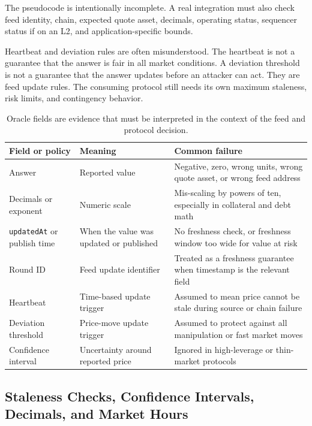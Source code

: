 The pseudocode is intentionally incomplete. A real integration must also check feed identity, chain, expected quote asset, decimals, operating status, sequencer status if on an L2, and application-specific bounds.

Heartbeat and deviation rules are often misunderstood. The heartbeat is not a guarantee that the answer is fair in all market conditions. A deviation threshold is not a guarantee that the answer updates before an attacker can act. They are feed update rules. The consuming protocol still needs its own maximum staleness, risk limits, and contingency behavior.

\begin{table}[htbp]
\centering
\small
\renewcommand{\arraystretch}{1.16}
\begin{tabularx}{\textwidth}{@{}>{\RaggedRight\arraybackslash}p{}>{\RaggedRight\arraybackslash}p{}X@{}}
\toprule
Field or policy & Meaning & Common failure \\
\midrule
Answer & Reported value & Negative, zero, wrong units, wrong quote asset, or wrong feed address \\
Decimals or exponent & Numeric scale & Mis-scaling by powers of ten, especially in collateral and debt math \\
\texttt{updatedAt} or publish time & When the value was updated or published & No freshness check, or freshness window too wide for value at risk \\
Round ID & Feed update identifier & Treated as a freshness guarantee when timestamp is the relevant field \\
Heartbeat & Time-based update trigger & Assumed to mean price cannot be stale during source or chain failure \\
Deviation threshold & Price-move update trigger & Assumed to protect against all manipulation or fast market moves \\
Confidence interval & Uncertainty around reported price & Ignored in high-leverage or thin-market protocols \\
\bottomrule
\end{tabularx}
\caption{Oracle fields are evidence that must be interpreted in the context of the feed and protocol decision.}
\end{table}

\subsection{Staleness Checks, Confidence Intervals, Decimals, and Market Hours}

